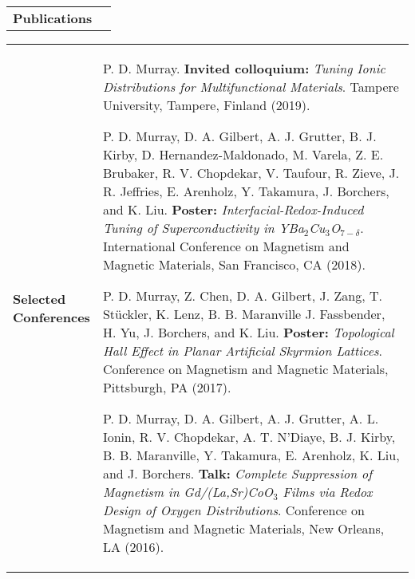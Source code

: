 \documentclass[10pt,letterpaper]{article}
\newcommand{\coll}{1.2}
\newcommand{\colr}{8}
\begin{document}
\vspace{-0.5cm}
\begin{longtabu} to \textwidth{X[\coll] X[\colr]}
    \textbf{Publications} & \vspace{-0.55cm}\printbibliography[heading=none]
\end{longtabu}
\vspace{-0.5cm}
\begin{longtabu} to \textwidth{X[\coll] X[\colr]}
    \textbf{Selected \newline Conferences} & P. D. Murray. \textbf{Invited colloquium:} \emph{Tuning Ionic Distributions for Multifunctional Materials}. Tampere University, Tampere, Finland (2019). \newline

    P. D. Murray, D. A. Gilbert, A. J. Grutter, B. J. Kirby, D. Hernandez-Maldonado, M. Varela, Z. E. Brubaker, R. V. Chopdekar, V. Taufour, R. Zieve, J. R. Jeffries, E. Arenholz, Y. Takamura, J. Borchers, and K. Liu. \textbf{Poster:} \emph{Interfacial-Redox-Induced Tuning of Superconductivity in YBa$_2$Cu$_3$O$_{7-\delta}$}. International Conference on Magnetism and Magnetic Materials, San Francisco, CA (2018). \newline

    P. D. Murray, Z. Chen, D. A. Gilbert, J. Zang, T. Stückler, K. Lenz, B. B. Maranville J. Fassbender, H. Yu, J. Borchers, and K. Liu. \textbf{Poster:} \emph{Topological Hall Effect in Planar Artificial Skyrmion Lattices}. Conference on Magnetism and Magnetic Materials, Pittsburgh, PA (2017). \newline

    P. D. Murray, D. A. Gilbert, A. J. Grutter, A. L. Ionin, R. V. Chopdekar, A. T. N’Diaye, B. J. Kirby, B. B. Maranville, Y. Takamura, E. Arenholz, K. Liu, and J. Borchers. \textbf{Talk:} \emph{Complete Suppression of Magnetism in Gd/(La,Sr)CoO$_3$ Films via Redox Design of Oxygen Distributions}. Conference on Magnetism and Magnetic Materials, New Orleans, LA (2016). \newline

\end{longtabu}
\end{document}
